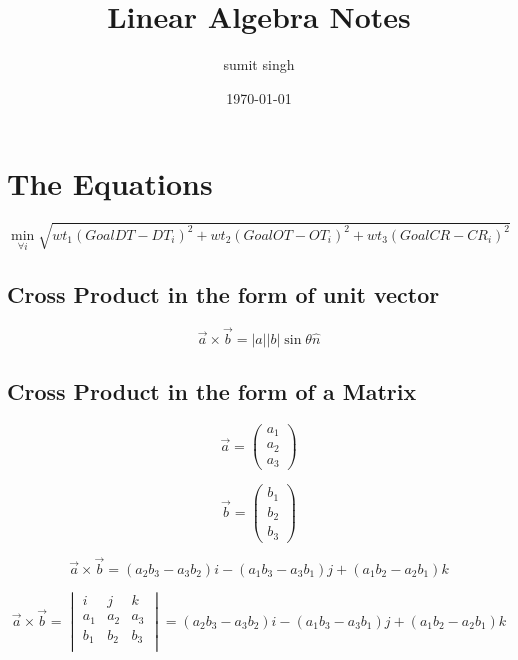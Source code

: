 \documentclass{article}
\title{Linear Algebra Notes}
\author{sumit singh}
\date{\today}
\begin{document}
\maketitle

\section{The Equations}

\begin{equation}
    \min_{\forall i} \sqrt{wt_1 (GoalDT - DT_i)^2 + wt_2 (Goal OT - OT_i)^2 +wt_3 (Goal CR - CR_i)^2}
\end{equation}
\subsection{Cross Product in the form of unit vector}
\begin{equation}
    \Vec{a} \times \Vec{b} = |a| |b| \sin\theta   \hat{n}
\end{equation}
\subsection{Cross Product in the form of a Matrix}
\begin{equation}
    \vec{a} = \begin{pmatrix}
        a_1 \\ a_2 \\ a_3
    \end{pmatrix}
\end{equation}

\begin{equation}
    \vec{b} = \begin{pmatrix}
        b_1 \\ b_2 \\ b_3
    \end{pmatrix}
\end{equation}



\begin{equation}
   \vec{a} \times \vec{b} = (a_2 b_3 -a_3 b_2)i  - (a_1b_3 - a_3 b_1)j + (a_1 b_2 - a_2 b_1)k
\end{equation}

\begin{equation}
    \vec{a} \times \vec{b} = \begin{vmatrix}
        i & j & k \\
        a_1 & a_2 & a_3 \\
        b_1 & b_2 & b_3 \\
    \end{vmatrix} = (a_2b_3-a_3b_2)i - (a_1b_3 -a_3b_1)j + (a_1b_2-a_2 b_1)k
\end{equation}
\end{document}
